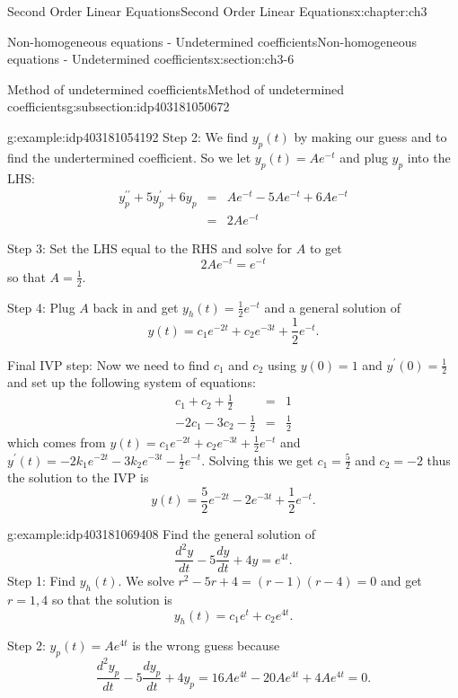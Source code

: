 \documentclass[oneside,10pt,]{book}
\numberwithin{equation}{section}
\numberwithin{equation}{section}
\newcommand{\amp}{&}
\begin{document}
\begin{chapterptx}{Second Order Linear Equations}{}{Second Order Linear Equations}{}{}{x:chapter:ch3}
\begin{sectionptx}{Non-homogeneous equations - Undetermined coefficients}{}{Non-homogeneous equations - Undetermined coefficients}{}{}{x:section:ch3-6}
\begin{subsectionptx}{Method of undetermined coefficients}{}{Method of undetermined coefficients}{}{}{g:subsection:idp403181050672}
\begin{example}{}{g:example:idp403181054192}
Step 2: We find \(y_{p}(t)\) by making our guess and to find the undertermined coefficient. So we let \(y_{p}(t)=Ae^{-t}\) and plug \(y_{p}\) into the LHS:%
\begin{align*}
y_{p}^{\prime\prime}+5y_{p}^{\prime}+6y_{p} \amp = \amp Ae^{-t}-5Ae^{-t}+6Ae^{-t}\\
\amp = \amp 2Ae^{-t}
\end{align*}
%
\par
Step 3: Set the LHS equal to the RHS and solve for \(A\) to get%
\begin{equation*}
2Ae^{-t}=e^{-t}
\end{equation*}
so that \(A=\frac{1}{2}\).%
\par
Step 4: Plug \(A\) back in and get \(y_{h}(t)=\frac{1}{2}e^{-t}\) and a general solution of%
\begin{equation*}
y(t)=c_{1}e^{-2t}+c_{2}e^{-3t}+\frac{1}{2}e^{-t}.
\end{equation*}
%
\par
Final IVP step: Now we need to find \(c_{1}\) and \(c_{2}\) using \(y(0)=1\) and \(y^{\prime}(0)=\frac{1}{2}\) and set up the following system of equations:%
\begin{align*}
c_{1}+c_{2}+\frac{1}{2} \amp = \amp 1\\
-2c_{1}-3c_{2}-\frac{1}{2} \amp = \amp \frac{1}{2}
\end{align*}
which comes from \(y(t)=c_{1}e^{-2t}+c_{2}e^{-3t}+\frac{1}{2}e^{-t}\) and \(y^{\prime}(t)=-2k_{1}e^{-2t}-3k_{2}e^{-3t}-\frac{1}{2}e^{-t}.\) Solving this we get \(c_{1}=\frac{5}{2}\) and \(c_{2}=-2\) thus the solution to the IVP is%
\begin{equation*}
y(t)=\frac{5}{2}e^{-2t}-2e^{-3t}+\frac{1}{2}e^{-t}.
\end{equation*}
%
\end{example}
\begin{example}{}{g:example:idp403181069408}%
Find the general solution of%
\begin{equation*}
\frac{d^{2}y}{dt}-5\frac{dy}{dt}+4y=e^{4t}.
\end{equation*}
Step 1: Find \(y_{h}(t)\). We solve \(r^{2}-5r+4=(r-1)(r-4)=0\) and get \(r=1,4\) so that the solution is%
\begin{equation*}
y_{h}(t)=c_{1}e^{t}+c_{2}e^{4t}.
\end{equation*}
%
\par
Step 2: \(y_{p}(t)=Ae^{4t}\) is the wrong guess because%
\begin{equation*}
\frac{d^{2}y_{p}}{dt}-5\frac{dy_{p}}{dt}+4y_{p}=16Ae^{4t}-20Ae^{4t}+4Ae^{4t}=0.

\end{equation*}
\end{example}
\end{subsectionptx}
\end{sectionptx}
\end{chapterptx}
\end{document}
